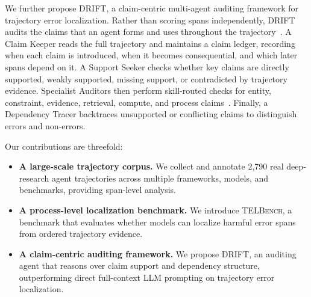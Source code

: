 We further propose \textsc{DRIFT}, a claim-centric multi-agent auditing framework for trajectory error localization. Rather than scoring spans independently, \textsc{DRIFT} audits the claims that an agent forms and uses throughout the trajectory~\citep{thorne-etal-2018-fever}. A Claim Keeper reads the full trajectory and maintains a claim ledger, recording when each claim is introduced, when it becomes consequential, and which later spans depend on it. A Support Seeker checks whether key claims are directly supported, weakly supported, missing support, or contradicted by trajectory evidence. Specialist Auditors then perform skill-routed checks for entity, constraint, evidence, retrieval, compute, and process claims~\citep{NEURIPS2023_cd86a305}. Finally, a Dependency Tracer backtraces unsupported or conflicting claims to distinguish errors and non-errors.

Our contributions are threefold:
\begin{itemize}
    \item \textbf{A large-scale trajectory corpus.}
    We collect and annotate 2,790 real deep-research agent trajectories across multiple frameworks, models, and benchmarks, providing span-level analysis.

    \item \textbf{A process-level localization benchmark.}
    We introduce \textsc{TELBench}, a benchmark that evaluates whether models can localize harmful error spans from ordered trajectory evidence.

    \item \textbf{A claim-centric auditing framework.}
    We propose \textsc{DRIFT}, an auditing agent that reasons over claim support and dependency structure, outperforming direct full-context LLM prompting on trajectory error localization.
\end{itemize}

